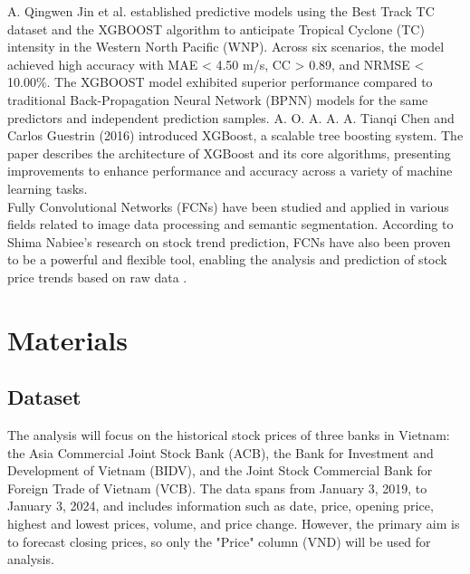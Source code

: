 \documentclass{ieeeojies}
\begin{document}
A. Qingwen Jin et al. \cite{jin2019using} established predictive models using the Best Track TC dataset and the XGBOOST algorithm to anticipate Tropical Cyclone (TC) intensity in the Western North Pacific (WNP). Across six scenarios, the model achieved high accuracy with MAE < 4.50 m/s, CC > 0.89, and NRMSE < 10.00\%. The XGBOOST model exhibited superior performance compared to traditional Back-Propagation Neural Network (BPNN) models for the same predictors and independent prediction samples. A. O. A. A. A. Tianqi Chen and Carlos Guestrin (2016)\cite{chen2016xgboost} introduced XGBoost, a scalable tree boosting system. The paper describes the architecture of XGBoost and its core algorithms, presenting improvements to enhance performance and accuracy across a variety of machine learning tasks.\\

Fully Convolutional Networks (FCNs) have been studied and applied in various fields related to image data processing and semantic segmentation. According to Shima Nabiee's research on stock trend prediction, FCNs have also been proven to be a powerful and flexible tool, enabling the analysis and prediction of stock price trends based on raw data \cite{nabiee2023stock}.
\section{Materials}
\subsection{Dataset}

The analysis will focus on the historical stock prices of three banks in Vietnam: the Asia Commercial Joint Stock Bank (ACB), the Bank for Investment and Development of Vietnam (BIDV), and the Joint Stock Commercial Bank for Foreign Trade of Vietnam (VCB). The data spans from January 3, 2019, to January 3, 2024, and includes information such as date, price, opening price, highest and lowest prices, volume, and price change. However, the primary aim is to forecast closing prices, so only the "Price" column (VND) will be used for analysis.
\end{document}
